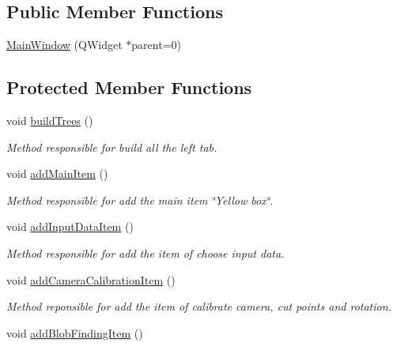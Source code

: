 \subsection*{Public Member Functions}
\begin{DoxyCompactItemize}
\item 
\hyperlink{classMainWindow_a8b244be8b7b7db1b08de2a2acb9409db}{Main\-Window} (Q\-Widget $\ast$parent=0)
\end{DoxyCompactItemize}
\subsection*{Protected Member Functions}
\begin{DoxyCompactItemize}
\item 
void \hyperlink{classMainWindow_a904aeccdff7a61af31954793944ef364}{build\-Trees} ()
\begin{DoxyCompactList}\small\item\em Method responsible for build all the left tab. \end{DoxyCompactList}\item 
void \hyperlink{classMainWindow_a7f3e055a4f80071b7265cc32d10b1a29}{add\-Main\-Item} ()
\begin{DoxyCompactList}\small\item\em Method responsible for add the main item \char`\"{}\-Yellow box\char`\"{}. \end{DoxyCompactList}\item 
\hypertarget{classMainWindow_aa2cc5fc73f649129465c371368185189}{void \hyperlink{classMainWindow_aa2cc5fc73f649129465c371368185189}{add\-Input\-Data\-Item} ()}\label{classMainWindow_aa2cc5fc73f649129465c371368185189}

\begin{DoxyCompactList}\small\item\em Method responsible for add the item of choose input data. \end{DoxyCompactList}\item 
\hypertarget{classMainWindow_ae887769c9a6614f6827afdb74ab9cd12}{void \hyperlink{classMainWindow_ae887769c9a6614f6827afdb74ab9cd12}{add\-Camera\-Calibration\-Item} ()}\label{classMainWindow_ae887769c9a6614f6827afdb74ab9cd12}

\begin{DoxyCompactList}\small\item\em Method reponsible for add the item of calibrate camera, cut points and rotation. \end{DoxyCompactList}\item 
\hypertarget{classMainWindow_a659cf521c8e7053eaba4971293050883}{void \hyperlink{classMainWindow_a659cf521c8e7053eaba4971293050883}{add\-Blob\-Finding\-Item} ()}\label{classMainWindow_a659cf521c8e7053eaba4971293050883}


\end{DoxyCompactItemize}
